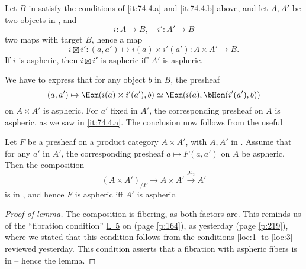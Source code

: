 \setcounter{corollarynum}{0}
\begin{corollarynum}\label{cor:74.4.1}
  Let $B$ in \Cat{} satisfy the conditions of \textup{\ref{it:74.4.a}}
  and \textup{\ref{it:74.4.b}} above, and let $A,A'$ be two objects in
  \Cat, and
  \[i : A\to B, \quad i':A' \to B\]
  two maps with target $B$, hence a map
  \[ i\boxtimes i' : (a,a')\mapsto i(a)\times i'(a') : A\times A'\to
  B.\]
  If $i$ is aspheric, then $i\boxtimes i'$ is aspheric if{f} $A'$ is aspheric.
\end{corollarynum}

We have to express that for any object $b$ in $B$, the presheaf
\[ (a,a') \mapsto \Hom(i(a)\times i'(a'),b) \simeq \Hom(i(a),
\bHom(i'(a'),b))\]
on $A\times A'$ is aspheric. For $a'$ fixed in $A'$, the corresponding
presheaf on $A$ is aspheric, as we saw in \ref{it:74.4.a}. The
conclusion now follows from the useful
\begin{lemma}
  Let $F$ be a presheaf on a product category $A\times A'$, with
  $A,A'$ in \Cat. Assume that for any $a'$ in $A'$, the corresponding
  presheaf $a\mapsto F(a,a')$ on $A$ be aspheric. Then the composition
  \[(A\times A')_{/F} \to A\times A' \xrightarrow{\mathrm{pr}_2} A'\]
  is in \scrW, and hence $F$ is aspheric if{f} $A'$ is aspheric.
\end{lemma}
\begin{proof}[Proof of lemma]
  The composition is fibering, as both factors are. This reminds us of
  the ``fibration condition'' \hyperref[it:64.L5]{L~5} on \scrW{}
  (page \ref{p:164}), as yesterday (page \ref{p:219}), where we stated
  that this condition follows from the conditions \ref{loc:1} to
  \ref{loc:3} reviewed yesterday. This condition asserts that a
  fibration with aspheric fibers is in \scrW{} -- hence the lemma.
\end{proof}
